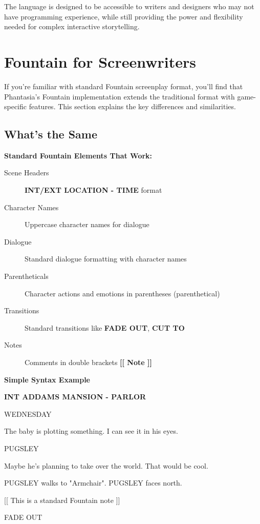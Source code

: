 \documentclass[11pt,letterpaper,oldstylefigures]{memoir}
\newcommand{\slugline}[1]{\nobreak\textbf{\MakeUppercase{#1}}\par\nobreak\vspace{1\baselineskip}}
\newcommand{\speaker}[1]{\nobreak\hspace*{0.333\textwidth}\MakeUppercase{#1}\par\nobreak\vspace{0.5\baselineskip}}
\newcommand{\dialogue}[1]{\nobreak\hspace*{0.25\textwidth}\begin{minipage}{0.5\textwidth}#1\end{minipage}\par\vspace{1\baselineskip}}
\newcommand{\stagedir}[1]{#1\par\vspace{1\baselineskip}}
\newenvironment{FountainExample}
  {\begingroup
  \ttfamily\small
   \setlength{\parindent}{0pt}
  \setlength{\parskip}{0.5em}
  \allowdisplaybreaks
  \setlength{\displaywidowpenalty}{0}
  \setlength{\widowpenalty}{0}
  \setlength{\clubpenalty}{0}
  \setlength{\interlinepenalty}{0}
}
  {\endgroup}
\newcommand{\sceneendcmd}[1]{\begin{flushright}\ttfamily #1\end{flushright}}
\newenvironment{SimpleExample}
{\begingroup
\small
\setlength{\parindent}{0pt}
\setlength{\parskip}{0.5em}
\allowdisplaybreaks
\setlength{\displaywidowpenalty}{0}
\setlength{\widowpenalty}{0}
\setlength{\clubpenalty}{0}
\setlength{\interlinepenalty}{0}
\begin{tcolorbox}[
    colback=blue!5,
    colframe=blue!75!black,
    boxrule=0.5pt,
    arc=2pt,
    left=0.5em,
    right=0.5em,
    top=0.25em,
    bottom=0.25em
]
\textbf{Simple Syntax Example}
\end{tcolorbox}\par
}
{\endgroup}
\newcommand{\fountain}[1]{\textbf{#1}}
\newcommand{\Phantasia}{{\irishfont Phantasia}}
\begin{document}
The language is designed to be accessible to writers and designers who may not have programming experience, while still providing the power and flexibility needed for complex interactive storytelling.

\section{Fountain for Screenwriters}
\label{sec:fountain-for-screenwriters}

If you're familiar with standard Fountain screenplay format, you'll find that \Phantasia's Fountain implementation extends the traditional format with game-specific features. This section explains the key differences and similarities.

\subsection{What's the Same}

\textbf{Standard Fountain Elements That Work:}
\begin{description}
\item[Scene Headers] \fountain{INT/EXT LOCATION - TIME} format
\item[Character Names] Uppercase character names for dialogue
\item[Dialogue] Standard dialogue formatting with character names
\item[Parentheticals] Character actions and emotions in parentheses (\gls{parenthetical})
\item[Transitions] Standard transitions like \fountain{FADE OUT}, \fountain{CUT TO}
\item[Notes] Comments in double brackets \fountain{[[ Note ]]}
\end{description}

\begin{SimpleExample}
\begin{FountainExample}
\slugline{INT ADDAMS MANSION - PARLOR}

\speaker{WEDNESDAY}
\dialogue{The baby is plotting something. I can see it in his eyes.}

\speaker{PUGSLEY}
\dialogue{Maybe he's planning to take over the world. That would be cool.}

\stagedir{PUGSLEY walks to "Armchair". PUGSLEY faces north.}

\stagedir{[[ This is a standard Fountain note ]]}

\sceneendcmd{FADE OUT}
\end{FountainExample}
\end{SimpleExample}
\end{document}
